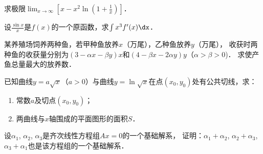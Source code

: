 \documentclass[plain,noanswer,medmath]{../../template/jnuexam}
\begin{document}



\begin{problem}
求极限$\lim_{x \to \infty} \left[x - x^2\ln \left(1 + \frac{1}{x} \right) \right]$．
\end{problem}



%



\begin{problem}
设$\frac{\sin x}{x}$是$f(x)$的一个原函数，求$\int x^3 f'(x)\dx$．
\end{problem}



\begin{problem}
某养殖场饲养两种鱼，若甲种鱼放养$x$（万尾），乙种鱼放养$y$（万尾），
收获时两种鱼的收获量分别为$(3 - \alpha x - \beta y)x$和$(4 - \beta x - 2\alpha y)y$（$\alpha > \beta > 0$)．
求使产鱼总量最大的放养数．
\end{problem}



\begin{problem}
已知曲线$y = a\sqrt{x}$（$a > 0$）与曲线$y = \ln \sqrt{x}$在点$(x_0,y_0)$处有公共切线，求：
\begin{enumerate}
\item 常数$a$及切点$(x_0,y_0)$；
\item 两曲线与$x$轴围成的平面图形的面积$S$．
\end{enumerate}
\end{problem}



%




\begin{problem}
设$\alpha_1$, $\alpha_2$, $\alpha_3$是齐次线性方程组$Ax = 0$的一个基础解系，
证明：$\alpha_1 + \alpha_2$, $\alpha_2 + \alpha_3$, $\alpha_3 + \alpha_1$也是该方程组的一个基础解系．
\end{problem}
\end{document}
